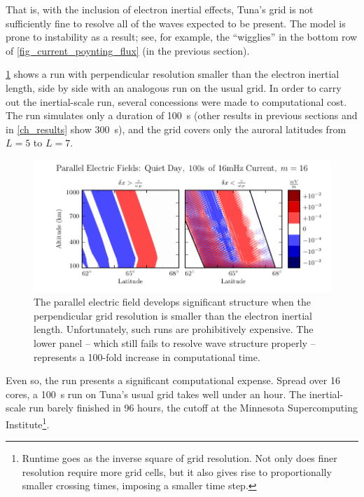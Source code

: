 That is, with the inclusion of electron inertial effects, Tuna's grid is not sufficiently fine to resolve all of the waves expected to be present. The model is prone to instability as a result; see, for example, the ``wigglies'' in the bottom row of \cref{fig_current_poynting_flux} (in the previous section). 

\cref{fig_inertial_length} shows a run with perpendicular resolution smaller than the electron inertial length, side by side with an analogous run on the usual grid. In order to carry out the inertial-scale run, several concessions were made to computational cost. The run simulates only a duration of \SI{100}{\s} (other results in previous sections and in \cref{ch_results} show \SI{300}{\s}), and the grid covers only the auroral latitudes from $L=5$ to $L=7$. 

\begin{figure}[!htb]
    \centering
    \includegraphics[width=\textwidth]{figures/inertial_length.pdf}
    \caption[Parallel Electric Fields by Perpendicular Grid Resolution]{
      The parallel electric field develops significant structure when the perpendicular grid resolution is smaller than the electron inertial length. Unfortunately, such runs are prohibitively expensive. The lower panel -- which still fails to resolve wave structure properly -- represents a 100-fold increase in computational time. 
    }
    \label{fig_inertial_length}
\end{figure}

Even so, the run presents a significant computational expense. Spread over 16 cores, a \SI{100}{\s} run on Tuna's usual grid takes well under an hour. The inertial-scale run barely finished in 96 hours, the cutoff at the Minnesota Supercomputing Institute\footnote{Runtime goes as the inverse square of grid resolution. Not only does finer resolution require more grid cells, but it also gives rise to proportionally smaller crossing times, imposing a smaller time step. }.

